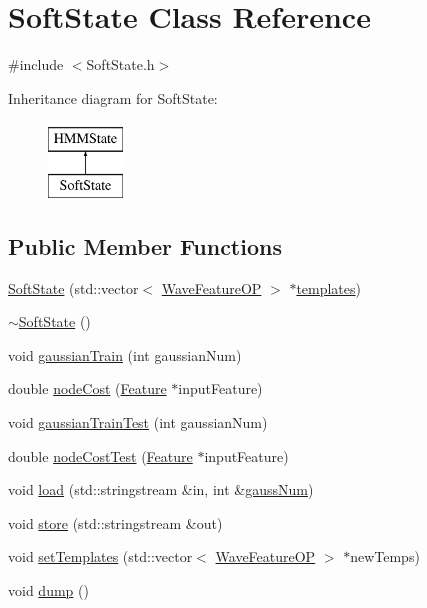 \hypertarget{class_soft_state}{\section{Soft\+State Class Reference}
\label{class_soft_state}
}


{\ttfamily \#include $<$Soft\+State.\+h$>$}

Inheritance diagram for Soft\+State\+:\begin{figure}[H]
\begin{center}
\leavevmode
\includegraphics[height=2.000000cm]{class_soft_state}
\end{center}
\end{figure}
\subsection*{Public Member Functions}
\begin{DoxyCompactItemize}
\item 
\hyperlink{class_soft_state_a2e36cf999cc8ea73e00037093b4bd7cc}{Soft\+State} (std\+::vector$<$ \hyperlink{class_wave_feature_o_p}{Wave\+Feature\+O\+P} $>$ $\ast$\hyperlink{class_h_m_m_state_a04d0b1a1570a339e5cd0db13aeb0d2ae}{templates})
\item 
\hyperlink{class_soft_state_a99aeafbfb62ed73460d8f2d3d5011a5d}{$\sim$\+Soft\+State} ()
\item 
void \hyperlink{class_soft_state_ab7658b800fe20e84f8ed898d12c082a4}{gaussian\+Train} (int gaussian\+Num)
\item 
double \hyperlink{class_soft_state_aefe179676d2eb32304ddd04da60208f4}{node\+Cost} (\hyperlink{class_feature}{Feature} $\ast$input\+Feature)
\item 
void \hyperlink{class_soft_state_aa9666d6365a4f5fc0c329165f745c89e}{gaussian\+Train\+Test} (int gaussian\+Num)
\item 
double \hyperlink{class_soft_state_a37b85b634e49773fd85539cc2f55d62f}{node\+Cost\+Test} (\hyperlink{class_feature}{Feature} $\ast$input\+Feature)
\item 
void \hyperlink{class_soft_state_a157535fbd2cc224f30c06ac385a4377b}{load} (std\+::stringstream \&in, int \&\hyperlink{pro6__demo_8cpp_a923ffcfa3c56ccdba17bc4e700247d54}{gauss\+Num})
\item 
void \hyperlink{class_soft_state_a0d8a511a0ba9a18b797ecb07f96f944f}{store} (std\+::stringstream \&out)
\item 
void \hyperlink{class_soft_state_a5577579995771ff34512c576ddfd5885}{set\+Templates} (std\+::vector$<$ \hyperlink{class_wave_feature_o_p}{Wave\+Feature\+O\+P} $>$ $\ast$new\+Temps)
\item 
void \hyperlink{class_soft_state_a8945e17e64d61c11dedfd85d458c98e2}{dump} ()
\end{DoxyCompactItemize}
